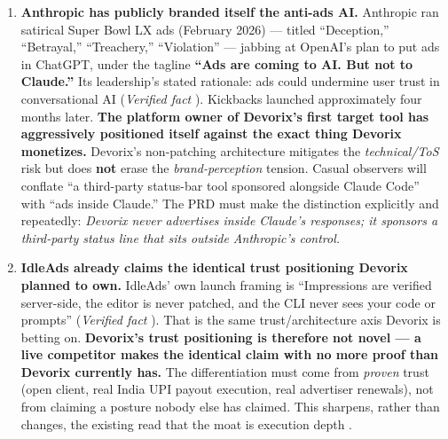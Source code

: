 \begin{enumerate}
\item \textbf{Anthropic has publicly branded itself the anti-ads AI.} Anthropic ran satirical Super Bowl LX ads (February 2026) --- titled ``Deception,'' ``Betrayal,'' ``Treachery,'' ``Violation'' --- jabbing at OpenAI's plan to put ads in ChatGPT, under the tagline \textbf{``Ads are coming to AI. But not to Claude.''} Its leadership's stated rationale: ads could undermine user trust in conversational AI (\emph{Verified fact} \cite{anthropic_antiads_fortune_2026,anthropic_antiads_techcrunch_2026,anthropic_antiads_cnbc_2026}). Kickbacks launched approximately four months later. \textbf{The platform owner of Devorix's first target tool has aggressively positioned itself against the exact thing Devorix monetizes.} Devorix's non-patching architecture mitigates the \emph{technical/ToS} risk \cite{masterplan_2026} but does \textbf{not} erase the \emph{brand-perception} tension. Casual observers will conflate ``a third-party status-bar tool sponsored alongside Claude Code'' with ``ads inside Claude.'' The PRD must make the distinction explicitly and repeatedly: \emph{Devorix never advertises inside Claude's responses; it sponsors a third-party status line that sits outside Anthropic's control.}

\item \textbf{IdleAds already claims the identical trust positioning Devorix planned to own.} IdleAds' own launch framing is ``Impressions are verified server-side, the editor is never patched, and the CLI never sees your code or prompts'' (\emph{Verified fact} \cite{idleads_showhn_2026}). That is the same trust/architecture axis Devorix is betting on. \textbf{Devorix's trust positioning is therefore not novel --- a live competitor makes the identical claim with no more proof than Devorix currently has.} The differentiation must come from \emph{proven} trust (open client, real India UPI payout execution, real advertiser renewals), not from claiming a posture nobody else has claimed. This sharpens, rather than changes, the existing read that the moat is execution depth \cite{masterplan_2026}.


\end{enumerate}
